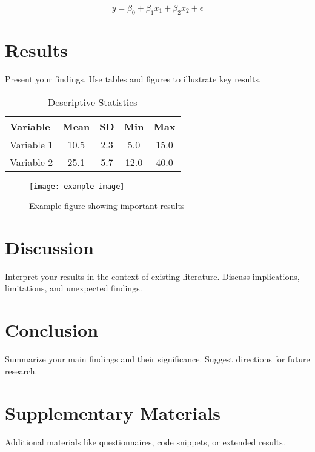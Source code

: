 \documentclass[11pt,a4paper]{article}
\begin{document}
\begin{equation}
\label{eq:example}
y = \beta_0 + \beta_1 x_1 + \beta_2 x_2 + \epsilon
\end{equation}

\section{Results}
\label{sec:results}

Present your findings. Use tables and figures to illustrate key results.

\begin{table}[htbp]
\centering
\caption{Descriptive Statistics}
\label{tab:descriptives}
\begin{tabular}{lcccc}
\toprule
Variable & Mean & SD & Min & Max \\
\midrule
Variable 1 & 10.5 & 2.3 & 5.0 & 15.0 \\
Variable 2 & 25.1 & 5.7 & 12.0 & 40.0 \\
\bottomrule
\end{tabular}
\end{table}

\begin{figure}[htbp]
\centering
\texttt{[image: example-image]}
\caption{Example figure showing important results}
\label{fig:results}
\end{figure}

\section{Discussion}
\label{sec:discussion}

Interpret your results in the context of existing literature. Discuss implications, limitations, and unexpected findings.

\section{Conclusion}
\label{sec:conclusion}

Summarize your main findings and their significance. Suggest directions for future research.

%
%

\appendix
\section{Supplementary Materials}
\label{app:supplementary}

Additional materials like questionnaires, code snippets, or extended results.
\end{document}
